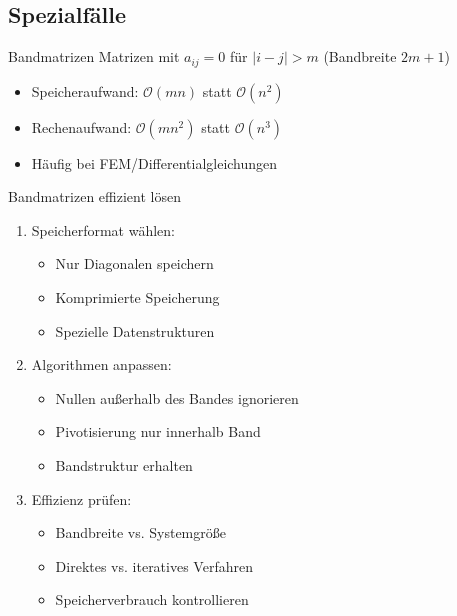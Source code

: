 \subsection{Spezialfälle}

\begin{concept}{Bandmatrizen}
Matrizen mit $a_{ij}=0$ für $|i-j|>m$ (Bandbreite $2m+1$)
\begin{itemize}
    \item Speicheraufwand: $\mathcal{O}(mn)$ statt $\mathcal{O}(n^2)$
    \item Rechenaufwand: $\mathcal{O}(mn^2)$ statt $\mathcal{O}(n^3)$
    \item Häufig bei FEM/Differentialgleichungen
\end{itemize}
\end{concept}

\begin{KR}{Bandmatrizen effizient lösen}
\begin{enumerate}
    \item Speicherformat wählen:
    \begin{itemize}
        \item Nur Diagonalen speichern
        \item Komprimierte Speicherung
        \item Spezielle Datenstrukturen
    \end{itemize}
    
    \item Algorithmen anpassen:
    \begin{itemize}
        \item Nullen außerhalb des Bandes ignorieren
        \item Pivotisierung nur innerhalb Band
        \item Bandstruktur erhalten
    \end{itemize}
    
    \item Effizienz prüfen:
    \begin{itemize}
        \item Bandbreite vs. Systemgröße
        \item Direktes vs. iteratives Verfahren
        \item Speicherverbrauch kontrollieren
    \end{itemize}
\end{enumerate}
\end{KR}

